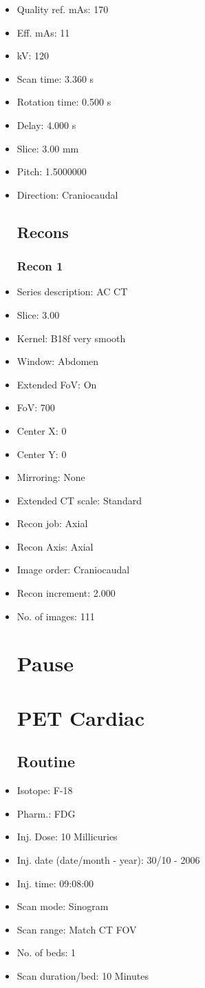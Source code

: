 \documentclass[12pt]{article}
\begin{document}
\begin{itemize}
\subsection{Scan}
\item Quality ref. mAs: 170\item Eff. mAs: 11\item kV: 120\item Scan time: 3.360 s\item Rotation time: 0.500 s\item Delay: 4.000 s\item Slice: 3.00 mm\item Pitch: 1.5000000\item Direction: Craniocaudal\subsection{Recons}

\subsubsection{Recon 1}
\item Series description: AC CT
\item Slice: 3.00
\item Kernel: B18f very smooth
\item Window: Abdomen
\item Extended FoV: On
\item FoV: 700
\item Center X: 0
\item Center Y: 0
\item Mirroring: None
\item Extended CT scale: Standard
\item Recon job: Axial
\item Recon Axis: Axial
\item Image order: Craniocaudal
\item Recon increment: 2.000
\item No. of images: 111
\section{Pause}
\section{PET Cardiac}\subsection{Routine}
\item Isotope: F-18
\item Pharm.: FDG
\item Inj. Dose: 10 Millicuries
\item Inj. date (date/month - year): 30/10 - 2006
\item Inj. time: 09:08:00
\item Scan mode: Sinogram
\item Scan range: Match CT FOV
\item No. of beds: 1
\item Scan duration/bed: 10 Minutes

\end{itemize}
\end{document}
